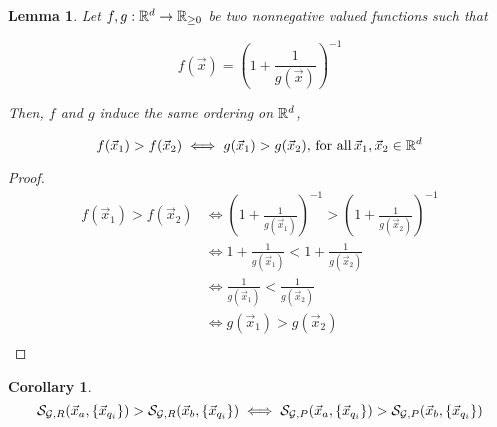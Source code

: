 \documentclass{article}
\theoremstyle{break}
\newtheorem{corollary}{Corollary}[theorem]
\newtheorem{lemma}[theorem]{Lemma}
\begin{document}
    \begin{lemma}
      Let $f,g:\mathbb{R}^d \rightarrow \mathbb{R}_{\geq 0}$ be two nonnegative valued functions such that

      \begin{equation}
        f(\vec x) = \left(1 + \frac{1}{g(\vec x)}\right)^{-1}
      \end{equation}

      Then, $f$ and $g$ induce the same ordering on $\mathbb{R}^d$, 

      \begin{equation}
        f(\vec x_1) > f(\vec x_2) \iff g(\vec x_1) > g(\vec x_2), \, 
            \text{for all} \, \vec x_1, \vec x_2 \in \mathbb{R}^d
      \end{equation}
    \end{lemma}
    
    \begin{proof}
      \begin{align}
        f(\vec x_1) > f(\vec x_2) &\iff \left(1 + \frac{1}{g(\vec x_1)}\right)^{-1} > 
            \left(1 + \frac{1}{g(\vec x_2)}\right)^{-1}\\
        &\iff 1 + \frac{1}{g(\vec x_1)} < 1 + \frac{1}{g(\vec x_2)} \\
        &\iff \frac{1}{g(\vec x_1)} < \frac{1}{g(\vec x_2)} \\
        &\iff g(\vec x_1) > g(\vec x_2) \\
      \end{align}
    \end{proof}

    \begin{corollary}
      \begin{equation}
        \mathcal{S}_{\mathcal{G}, R}(\vec x_a, \{{\vec x_{q_i}}\}) > \mathcal{S}_{\mathcal{G}, R}(\vec x_b, \{{\vec x_{q_i}}\}) \iff
         \mathcal{S}_{\mathcal{G}, P}(\vec x_a, \{{\vec x_{q_i}}\}) > \mathcal{S}_{\mathcal{G}, P}(\vec x_b, \{{\vec x_{q_i}}\}) 
      \end{equation}
    \end{corollary}
\end{document}
